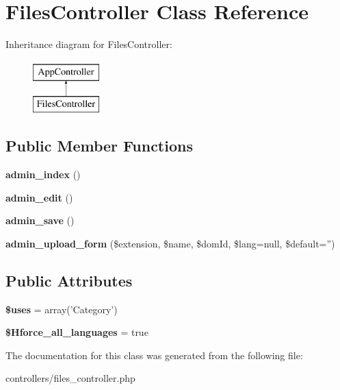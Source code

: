 \hypertarget{class_files_controller}{
\section{\-Files\-Controller \-Class \-Reference}
\label{class_files_controller}
}
\-Inheritance diagram for \-Files\-Controller\-:\begin{figure}[H]
\begin{center}
\leavevmode
\includegraphics[height=2.000000cm]{class_files_controller}
\end{center}
\end{figure}
\subsection*{\-Public \-Member \-Functions}
\begin{DoxyCompactItemize}
\item 
\hypertarget{class_files_controller_a9ba31ba9cd3c391f4aeee907f3cd8063}{
{\bfseries admin\-\_\-index} ()}
\label{class_files_controller_a9ba31ba9cd3c391f4aeee907f3cd8063}

\item 
\hypertarget{class_files_controller_a78d339c72ea30e6661ea1a145defb7fa}{
{\bfseries admin\-\_\-edit} ()}
\label{class_files_controller_a78d339c72ea30e6661ea1a145defb7fa}

\item 
\hypertarget{class_files_controller_a22faf9aea3cb352ecf019a8c33fc1982}{
{\bfseries admin\-\_\-save} ()}
\label{class_files_controller_a22faf9aea3cb352ecf019a8c33fc1982}

\item 
\hypertarget{class_files_controller_aa3b961c34bc768409d1f3ad65d4b69db}{
{\bfseries admin\-\_\-upload\-\_\-form} (\$extension, \$name, \$dom\-Id, \$lang=null, \$default='')}
\label{class_files_controller_aa3b961c34bc768409d1f3ad65d4b69db}

\end{DoxyCompactItemize}
\subsection*{\-Public \-Attributes}
\begin{DoxyCompactItemize}
\item 
\hypertarget{class_files_controller_ab3a763728a8e7b1af44c3fecfed42149}{
{\bfseries \$uses} = array('\-Category')}
\label{class_files_controller_ab3a763728a8e7b1af44c3fecfed42149}

\item 
\hypertarget{class_files_controller_afe0b5646585005a8bd0efe3e5cbfa942}{
{\bfseries \$\-Hforce\-\_\-all\-\_\-languages} = true}
\label{class_files_controller_afe0b5646585005a8bd0efe3e5cbfa942}

\end{DoxyCompactItemize}


\-The documentation for this class was generated from the following file\-:\begin{DoxyCompactItemize}
\item 
controllers/files\-\_\-controller.\-php\end{DoxyCompactItemize}
